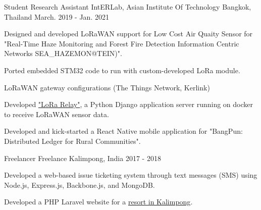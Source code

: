 \begin{cventries}
  \cventry
    {Student Research Assistant} %
    {IntERLab, Asian Institute Of Technology} %
    {Bangkok, Thailand} %
    {March. 2019 - Jan. 2021} %
    {\begin{cvitems} %
    \item {Designed and developed LoRaWAN support for Low Cost Air Quaity Sensor for "Real-Time Haze Monitoring and Forest Fire Detection Information Centric Networks {SEA\_HAZEMON@TEIN})".}
    \item {Ported embedded STM32 code to run with custom-developed LoRa module.}
    \item {LoRaWAN gateway configurations (The Things Network, Kerlink)}
    \item {Developed \href{https://lora.hazemon.in.th/}{"LoRa Relay"}, a Python Django application server running on docker to receive LoRaWAN sensor data.}
      \item {Developed and kick-started a React Native mobile application for "BangPun: Distributed Ledger for Rural Communities".}
      \end{cvitems}}

  \cventry
    {Freelancer} %
    {Freelance} %
    {Kalimpong, India} %
    {2017 - 2018} %
    {\begin{cvitems} %
        \item {Developed a web-based issue ticketing system through text messages (SMS) using Node.js, Express.js, Backbone.js, and MongoDB.}
    \item {Developed a PHP Laravel website for a \href{https://www.yururetreat.com/}{resort in Kalimpong}.}
      \end{cvitems}}


\end{cventries}

